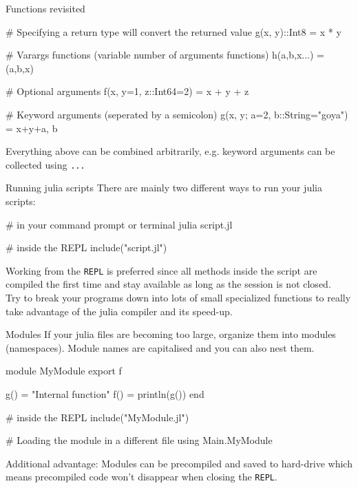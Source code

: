 \documentclass{beamer}
\newenvironment{Boxx}{\begin{tcolorbox}[standard jigsaw, opacityframe=0.8, opacityback=0.0]}{\end{tcolorbox}}
\begin{document}
\begin{frame}[fragile]{Functions revisited}

	\begin{Boxx}
		\begin{jllisting}
  # Specifying a return type will convert the returned value	
  g(x, y)::Int8 = x * y
  
  # Varargs functions (variable number of arguments functions)
  h(a,b,x...) = (a,b,x)
  
  # Optional arguments
  f(x, y=1, z::Int64=2) = x + y + z
  
  # Keyword arguments (seperated by a semicolon)
  g(x, y; a=2, b::String="goya") = x+y+a, b
		\end{jllisting}
	\end{Boxx}
Everything above can be combined arbitrarily, e.g. keyword arguments can be collected using \verb|...|

	
\end{frame}


\begin{frame}[fragile]{Running julia scripts}
	There are mainly two different ways to run your julia scripts:
	\begin{Boxx}
 \begin{jllisting}
  # in your command prompt or terminal
  julia script.jl
  
  # inside the REPL
  include("script.jl")
\end{jllisting}
\end{Boxx}
Working from the \verb|REPL| is preferred since all methods inside the script are compiled the first time and stay available as long as the session is not closed.\\

\vspace{4mm}
Try to break your programs down into lots of small specialized functions to really take advantage of the julia compiler and its speed-up.
\end{frame}


\begin{frame}[fragile]{Modules}
If your julia files are becoming too large, organize them into modules (namespaces). Module names are capitalised and you can also nest them.
\begin{Boxx}
  \begin{jllisting}
  module MyModule
    export f

    g() = "Internal function"
    f() = println(g())
  end
  
  # inside the REPL
  include("MyModule.jl")
  
  # Loading the module in a different file
  using Main.MyModule
  \end{jllisting}
\end{Boxx}
Additional advantage: Modules can be precompiled and saved to hard-drive which means precompiled code won't disappear when closing the \verb|REPL|.
\end{frame}
\end{document}
